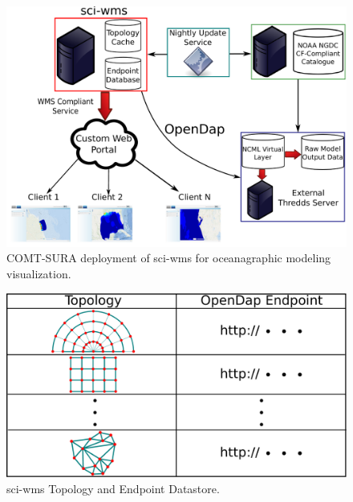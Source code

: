 \documentclass[11pt,twocolumn,twoside]{IEEEtran}
\begin{document}
\begin{figure}
  \centering
  \includegraphics[width=\columnwidth]{./figs/overview.pdf}
  \caption{COMT-SURA deployment of sci-wms for oceanagraphic modeling visualization.}
  \label{fig:overview1}
\end{figure}

\begin{figure}
  \centering
  \includegraphics[width=\columnwidth]{./figs/sciwms_db_topology_endpoints.pdf}
  \caption{sci-wms Topology and Endpoint Datastore.}
  \label{fig:sciwms_topology_endpoints}
\end{figure}



\end{document}
